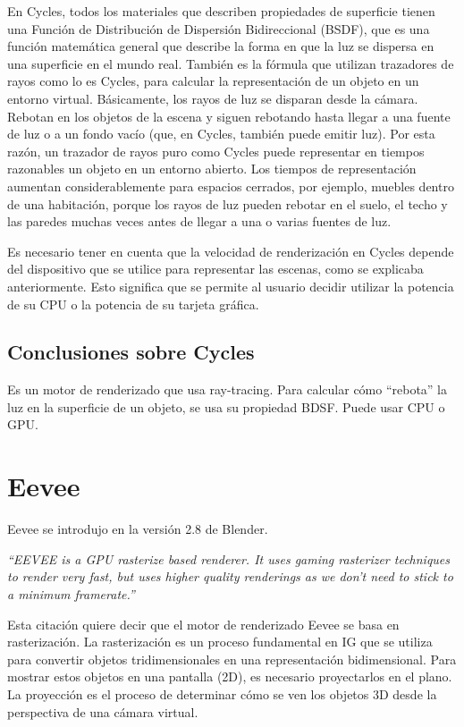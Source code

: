 \documentclass{article}
\begin{document}
En Cycles, todos los materiales que describen propiedades de superficie tienen una Función 
de Distribución de Dispersión Bidireccional (BSDF), que es una función matemática general 
que describe la forma en que la luz se dispersa en una superficie en el mundo real. También es
la fórmula que utilizan trazadores de rayos como lo es Cycles, para calcular la representación 
de un objeto en un entorno virtual. Básicamente, los rayos de luz se disparan desde la cámara. 
Rebotan en los objetos de la escena y siguen rebotando hasta llegar a una fuente de luz o a un 
fondo vacío (que, en Cycles, también puede emitir luz). Por esta razón, un trazador de rayos 
puro como Cycles puede representar en tiempos razonables un objeto en un entorno abierto. 
Los tiempos de representación aumentan considerablemente para espacios cerrados, por ejemplo, 
muebles dentro de una habitación, porque los rayos de luz pueden rebotar en el suelo, el techo 
y las paredes muchas veces antes de llegar a una o varias fuentes de luz.

Es necesario tener en cuenta que la velocidad de renderización en Cycles depende del dispositivo
que se utilice para representar las escenas, como se explicaba anteriormente. Esto significa que
se permite al usuario decidir utilizar la potencia de su CPU o la potencia de su tarjeta gráfica. 

\subsection{Conclusiones sobre Cycles}
Es un motor de renderizado que usa ray-tracing.
Para calcular cómo “rebota” la luz en la superficie de un objeto, se usa su propiedad BDSF.
Puede usar CPU o GPU.

\section{Eevee}
Eevee se introdujo en la versión 2.8 de Blender. 

\textit{“EEVEE is a GPU rasterize based renderer. It uses gaming rasterizer techniques to 
render very fast, but uses higher quality renderings as we don't need to stick to a minimum 
framerate.”}

Esta citación quiere decir que el motor de renderizado Eevee se basa en rasterización.
La rasterización es un proceso fundamental en IG que se utiliza para convertir objetos 
tridimensionales en una representación bidimensional. Para mostrar estos objetos en una
pantalla (2D), es necesario proyectarlos en el plano. La proyección es el proceso de 
determinar cómo se ven los objetos 3D desde la perspectiva de una cámara virtual.
\end{document}
